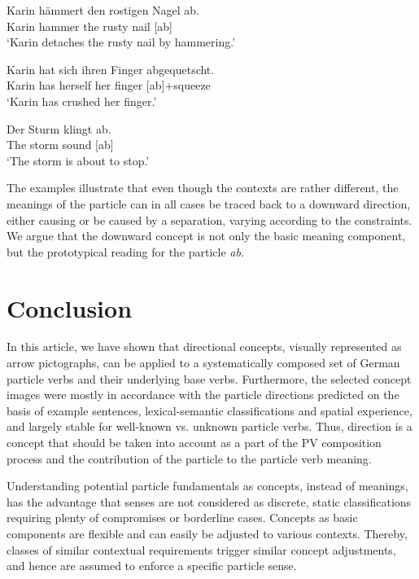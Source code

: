\documentclass[output=paper]{langsci/langscibook}
\begin{document}
\ea\label{ex:abhaemmern}
\gll Karin hämmert den rostigen Nagel ab.\\
Karin hammer the rusty nail [ab]\\
\glt `Karin detaches the rusty nail by hammering.'
\z


\ea\label{ex:abquetschen}
\gll Karin hat sich ihren Finger abgequetscht.\\
Karin has herself her finger [ab]+squeeze\\
\glt `Karin has crushed her finger.'
\z

\ea \label{ex:abklingenSturm}
\gll Der Sturm klingt ab.\\
The storm sound [ab]\\
\glt `The storm is about to stop.'
\z

The examples illustrate that even though the contexts are rather
different, the meanings of the particle can in all cases be traced
back to a downward direction, either causing or be caused by a
separation, varying according to the constraints. We argue that the
downward concept is not only the basic meaning component, but the
prototypical reading for the particle \textit{ab}.


\section{Conclusion}

In this article, we have shown that directional concepts, visually
represented as arrow pictographs, can be applied to a systematically
composed set of German particle verbs and their underlying base
verbs. Furthermore, the selected concept images were mostly in
accordance with the particle directions predicted on the basis of
example sentences, lexical-semantic classifications and spatial
experience, and largely stable for well-known vs. unknown particle
verbs. Thus, direction is a concept that should be taken into account
as a part of the PV composition process and the contribution of the
particle to the particle verb meaning.

Understanding potential particle fundamentals as concepts, instead of
meanings, has the advantage that senses are not considered as
discrete, static classifications requiring plenty of compromises or
borderline cases. Concepts as basic components are flexible and can
easily be adjusted to various contexts. Thereby, classes of similar
contextual requirements trigger similar concept adjustments, and hence
are assumed to enforce a specific particle sense.
\end{document}
